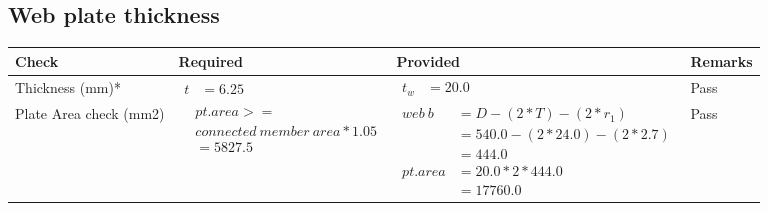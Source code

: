 \documentclass{article}%
\begin{document}
%
\newpage%
\subsection{Web plate thickness}%
\label{subsec:Webplatethickness}%
\renewcommand{\arraystretch}{1.2}%
\begin{longtable}{|p{2.5cm}|p{4.5cm}|p{7cm}|p{1.5cm}|}%
\hline%
\rowcolor{OsdagGreen}%
Check&Required&Provided&Remarks\\%
\hline%
\endhead%
\hline%
Thickness (mm)*&$\begin{aligned} t &=6.25\end{aligned}$&$\begin{aligned} t_w &=20.0\end{aligned}$&Pass\\%
\hline%
Plate Area check (mm2)&$\begin{aligned} &pt.area >= \\&connected~member~area * 1.05\\  &= 5827.5\end{aligned}$&$\begin{aligned} web~b &= D-(2*T)-(2*r_1)\\ &=540.0-(2*24.0)-(2*2.7)\\ &= 444.0 \\  pt.area &= 20.0*2* 444.0\\ &= 17760.0\end{aligned}$&Pass\\%
\hline%
\end{longtable}

%
\newpage%
\end{document}
